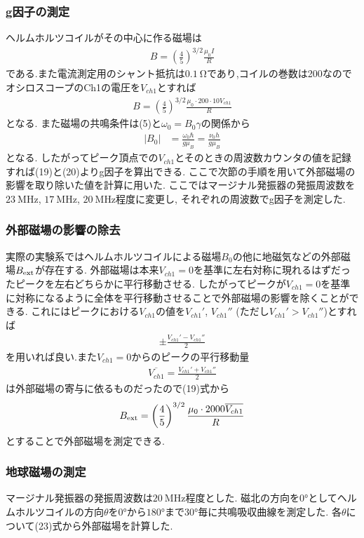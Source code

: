 \subsubsection{g因子の測定}
ヘルムホルツコイルがその中心に作る磁場は
\begin{align}
  B=\left(\frac{4}{5}\right)^{3/2}\frac{\mu_0I}{R}
\end{align}
である.また電流測定用のシャント抵抗は$0.1\ \si{\ohm}$であり,コイルの巻数は200なのでオシロスコープのCh1の電圧を$V_{ch1}$とすれば
\begin{align}
  B=\left(\frac{4}{5}\right)^{3/2}\frac{\mu_0\cdot 200\cdot10V_{ch1}}{R}
\end{align}
となる.
また磁場の共鳴条件は(5)と$\omega_0=B_0\gamma$の関係から
\begin{align}
  |B_0|&=\frac{\omega_0\hbar}{g\mu_B}=\frac{\nu_0 h}{g\mu_B}
\end{align}
となる.
したがってピーク頂点での$V_{ch1}$とそのときの周波数カウンタの値を記録すれば(19)と(20)よりg因子を算出できる.
ここで次節の手順を用いて外部磁場の影響を取り除いた値を計算に用いた.
ここではマージナル発振器の発振周波数を$23\ \si{\mega\hertz}$, $17\ \si{\mega\hertz}$, $20\ \si{\mega\hertz}$程度に変更し,
それぞれの周波数でg因子を測定した.
\subsubsection{外部磁場の影響の除去}
実際の実験系ではヘルムホルツコイルによる磁場$B_0$の他に地磁気などの外部磁場$B_{\rm ext}$が存在する.
外部磁場は本来$V_{ch1}=0$を基準に左右対称に現れるはずだったピークを左右どちらかに平行移動させる.
したがってピークが$V_{ch1}=0$を基準に対称になるように全体を平行移動させることで外部磁場の影響を除くことができる.
これにはピークにおける$V_{ch1}$の値を$V_{ch1}'$, $V_{ch1}''$ (ただし$V_{ch1}'>V_{ch1}''$)とすれば
\begin{align}
  \pm\frac{V_{ch1}'-V_{ch1}''}{2}
\end{align}
を用いれば良い.また$V_{ch1}=0$からのピークの平行移動量
\begin{align}
  \overline{V_{ch1}}=\frac{V_{ch1}'+V_{ch1}''}{2}
\end{align}
は外部磁場の寄与に依るものだったので(19)式から
\begin{align}
  B_{\rm ext}=\left(\frac{4}{5}\right)^{3/2}\frac{\mu_0\cdot 2000\overline{V_{ch1}}}{R}
\end{align}
とすることで外部磁場を測定できる.
\subsubsection{地球磁場の測定}
マージナル発振器の発振周波数は$20\ \si{\mega\hertz}$程度とした.
磁北の方向を$0\si{\degree}$としてヘルムホルツコイルの方向$\theta$を$0\si{\degree}$から$180\si{\degree}$まで$30\si{\degree}$毎に共鳴吸収曲線を測定した.
各$\theta$について(23)式から外部磁場を計算した.
